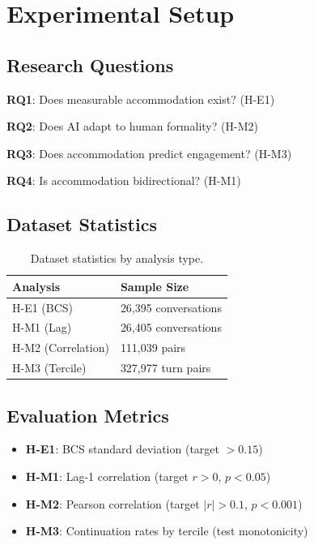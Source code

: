 \section{Experimental Setup}

\subsection{Research Questions}

\textbf{RQ1}: Does measurable accommodation exist? (H-E1)

\textbf{RQ2}: Does AI adapt to human formality? (H-M2)

\textbf{RQ3}: Does accommodation predict engagement? (H-M3)

\textbf{RQ4}: Is accommodation bidirectional? (H-M1)

\subsection{Dataset Statistics}

\begin{table}[h]
\centering
\begin{tabular}{@{}ll@{}}
\toprule
Analysis & Sample Size \\
\midrule
H-E1 (BCS) & 26,395 conversations \\
H-M1 (Lag) & 26,405 conversations \\
H-M2 (Correlation) & 111,039 pairs \\
H-M3 (Tercile) & 327,977 turn pairs \\
\bottomrule
\end{tabular}
\caption{Dataset statistics by analysis type.}
\label{tab:dataset}
\end{table}

\subsection{Evaluation Metrics}

\begin{itemize}
    \item \textbf{H-E1}: BCS standard deviation (target $> 0.15$)
    \item \textbf{H-M1}: Lag-1 correlation (target $r > 0$, $p < 0.05$)
    \item \textbf{H-M2}: Pearson correlation (target $|r| > 0.1$, $p < 0.001$)
    \item \textbf{H-M3}: Continuation rates by tercile (test monotonicity)
\end{itemize}
